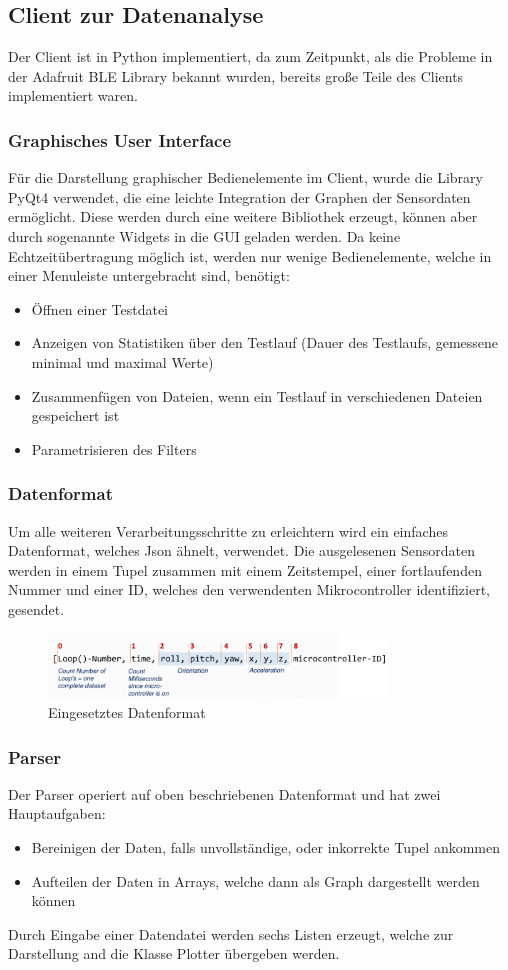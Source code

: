 \subsection{Client zur Datenanalyse}
Der Client ist in Python implementiert, da zum Zeitpunkt, als die Probleme in der Adafruit BLE Library bekannt wurden, bereits große Teile des Clients implementiert waren.
\subsubsection{Graphisches User Interface}
Für die Darstellung graphischer Bedienelemente im Client, wurde die Library PyQt4 verwendet, die eine leichte Integration der Graphen der Sensordaten ermöglicht. Diese werden durch eine weitere Bibliothek erzeugt, können aber durch sogenannte Widgets in die GUI geladen werden.
Da keine Echtzeitübertragung möglich ist, werden nur wenige Bedienelemente, welche in einer Menuleiste untergebracht sind, benötigt:
\begin{itemize}
\item Öffnen einer Testdatei
\item Anzeigen von Statistiken über den Testlauf (Dauer des Testlaufs, gemessene minimal und maximal Werte)
\item Zusammenfügen von Dateien, wenn ein Testlauf in verschiedenen Dateien gespeichert ist
\item Parametrisieren des Filters
\end{itemize}
\subsubsection{Datenformat}
Um alle weiteren Verarbeitungsschritte zu erleichtern wird ein einfaches Datenformat, welches Json ähnelt, verwendet. Die ausgelesenen Sensordaten werden in einem Tupel zusammen mit einem Zeitstempel, einer fortlaufenden Nummer und einer ID, welches den verwendenten Mikrocontroller identifiziert, gesendet.
\begin{figure}[h]
	\centering
	\includegraphics[width=0.8\textwidth]{images/k3-datenformat.png}
	\caption {Eingesetztes Datenformat}
	\label{fig:k3-datenformat.png} 
\end{figure}
\subsubsection{Parser}
Der Parser operiert auf oben beschriebenen Datenformat und hat zwei Hauptaufgaben:
\begin{itemize}
 \item Bereinigen der Daten, falls unvollständige, oder inkorrekte Tupel ankommen
 \item Aufteilen der Daten in Arrays, welche dann als Graph dargestellt werden können
\end{itemize}
Durch Eingabe einer Datendatei werden sechs Listen erzeugt, welche zur Darstellung and die Klasse Plotter übergeben werden.
